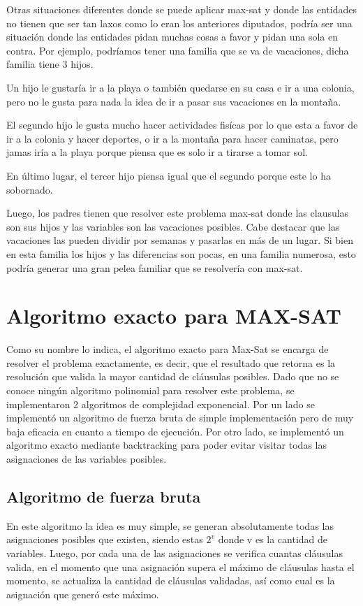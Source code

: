 \documentclass[a4paper,10pt]{article}
\begin{document}
Otras situaciones diferentes donde se puede aplicar max-sat y donde las entidades no tienen que ser tan laxos como lo eran los anteriores diputados, podr\'ia ser una situaci\'on donde las entidades pidan muchas cosas a favor y pidan una sola en contra. Por ejemplo, podr\'iamos tener una familia que se va de vacaciones, dicha familia tiene 3 hijos. 

Un hijo le gustar\'ia ir a la playa o tambi\'en quedarse en su casa e ir a una colonia, pero no le gusta para nada la idea de ir a pasar sus vacaciones en la monta\~{n}a.

El segundo hijo le gusta mucho hacer actividades fis\'icas por lo que esta a favor de ir a la colonia y hacer deportes, o ir a la monta\~{n}a para hacer caminatas, pero jamas ir\'ia a la playa porque piensa que es solo ir a tirarse a tomar sol. 

En \'ultimo lugar, el tercer hijo piensa igual que el segundo porque este lo ha sobornado.

Luego, los padres tienen que resolver este problema max-sat donde las clausulas son sus hijos y las variables son las vacaciones posibles. Cabe destacar que las vacaciones las pueden dividir por semanas y pasarlas en m\'as de un lugar. Si bien en esta familia los hijos y las diferencias son pocas, en una familia numerosa, esto podr\'ia generar una gran pelea familiar que se resolver\'ia con max-sat.


\section*{Algoritmo exacto para MAX-SAT}
Como su nombre lo indica, el algoritmo exacto para Max-Sat se encarga de resolver el problema exactamente, es decir, que el resultado que retorna es la resoluci\'on que valida la mayor cantidad de cl\'ausulas posibles. Dado que no se conoce ning\'un algoritmo polinomial para resolver este problema, se implementaron 2 algoritmos de complejidad exponencial. Por un lado se implement\'o un algoritmo de fuerza bruta de simple implementaci\'on pero de muy baja eficacia en cuanto a tiempo de ejecuci\'on. Por otro lado, se implement\'o un algoritmo exacto mediante backtracking para poder evitar visitar todas las asignaciones de las variables posibles.

\subsection*{Algoritmo de fuerza bruta}
En este algoritmo la idea es muy simple, se generan absolutamente todas las asignaciones posibles que existen, siendo estas $2^{v}$ donde v es la cantidad de variables. Luego, por cada una de las asignaciones se verifica cuantas cl\'ausulas valida, en el momento que una asignaci\'on supera el m\'aximo de cl\'ausulas hasta el momento, se actualiza la cantidad de cl\'ausulas validadas, as\'i como cual es la asignaci\'on que gener\'o este m\'aximo.
\end{document}
